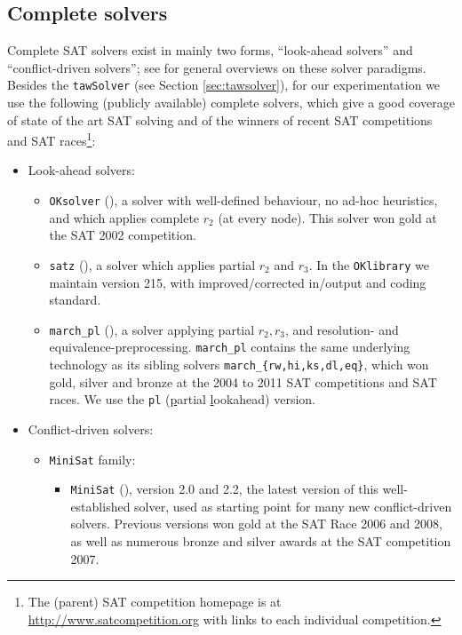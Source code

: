 \documentclass[final,3p,times]{elsarticle}
\theoremstyle{definition}
\newcommand{\OKlibrary}{\texttt{OKlibrary}}
\newcommand{\tawsolver}{\texttt{tawSolver}}
\newcommand{\oksolver}{\texttt{OKsolver}}
\newcommand{\satz}{\texttt{satz}}
\newcommand{\march}{\texttt{march\_pl}}
\newcommand{\minisat}{\texttt{MiniSat}}
\begin{document}
\subsection{Complete solvers}
\label{sec:remsatcomp}

Complete SAT solvers exist in mainly two forms, ``look-ahead solvers'' and ``conflict-driven solvers''; see \cite{MSLM09HBSAT,HvM09HBSAT} for general overviews on these solver paradigms. Besides the \tawsolver{} (see Section \ref{sec:tawsolver}), for our experimentation we use the following (publicly available) complete solvers, which give a good coverage of state of the art SAT solving and of the winners of recent SAT competitions and SAT races\footnote{The (parent) SAT competition homepage is at \url{http://www.satcompetition.org} with links to each individual competition.}:
\begin{itemize}
\item Look-ahead solvers:
  \begin{itemize}
  \item \oksolver{} (\cite{Ku2002h}), a solver with well-defined behaviour, no ad-hoc heuristics, and which applies complete $r_2$ (at every node). This solver won gold at the SAT 2002 competition.
  \item \satz{} (\cite{LA1996}), a solver which applies partial $r_2$ and $r_3$. In the \OKlibrary{} we maintain version 215, with improved/corrected in/output and coding standard.
  \item \march{} (\cite{HeuleDufourvanZwietenMaaren2004Reasoning}), a solver applying partial $r_2, r_3$, and resolution- and equivalence-preprocessing. \march{} contains the same underlying technology as its sibling solvers \texttt{march\_\{rw,hi,ks,dl,eq\}}, which won gold, silver and bronze at the 2004 to 2011 SAT competitions and SAT races. We use the \texttt{pl} (\underline{p}artial \underline{l}ookahead) version.
  \end{itemize}
\item Conflict-driven solvers:
  \begin{itemize}
  \item \texttt{MiniSat} family:
    \begin{itemize}
    \item \minisat{} (\cite{EenSoerensson2003Minisat}), version 2.0 and 2.2, the latest version of this well-established solver, used as starting point for many new conflict-driven solvers. Previous versions won gold at the SAT Race 2006 and 2008, as well as numerous bronze and silver awards at the SAT competition 2007.

\end{itemize}
\end{itemize}
\end{itemize}
\end{document}
